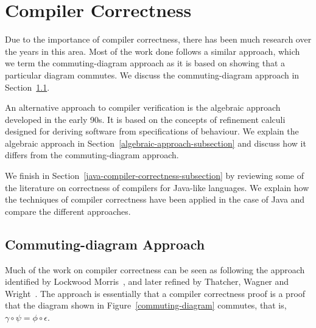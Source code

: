 \section{Compiler Correctness}
\label{compiler-correctness-section}

Due to the importance of compiler correctness, there has been much
research over the years in this area.
Most of the work done follows a similar approach, which we term
the commuting-diagram approach as it is based on showing that a
particular diagram commutes.
We discuss the commuting-diagram approach in
Section~\ref{commuting-diagram-subsection}.

An alternative approach to compiler verification is the algebraic
approach developed in the early 90s.
It is based on the concepts of refinement calculi designed for
deriving software from specifications of behaviour.
We explain the algebraic approach in
Section~\ref{algebraic-approach-subsection} and discuss how it differs
from the commuting-diagram approach.

We finish in Section~\ref{java-compiler-correctness-subsection} by
reviewing some of the literature on correctness of compilers for
Java-like languages.
We explain how the techniques of compiler correctness have been
applied in the case of Java and compare the different approaches.

\subsection{Commuting-diagram Approach}
\label{commuting-diagram-subsection}

Much of the work on compiler correctness can be seen as following the
approach identified by Lockwood Morris~\cite{morris1973}, and later
refined by Thatcher, Wagner and Wright~\cite{thatcher1979}.
The approach is essentially that a compiler correctness proof is a
proof that the diagram shown in Figure~\ref{commuting-diagram}
commutes, that is, $\gamma \circ \psi = \phi \circ \epsilon$.

